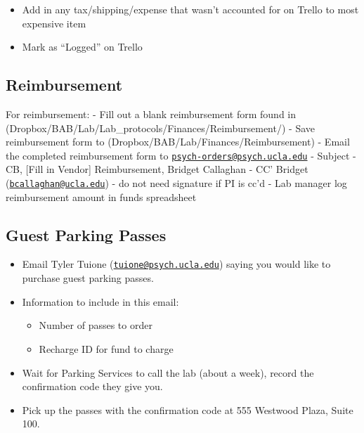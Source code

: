 \documentclass[]{book}
\providecommand{\tightlist}{%
  \setlength{\itemsep}{0pt}\setlength{\parskip}{0pt}}
\begin{document}
\begin{itemize}
  \begin{itemize}
  \tightlist
  \item
    Add in any tax/shipping/expense that wasn't accounted for on Trello to most expensive item
  \item
    Mark as ``Logged'' on Trello
  \end{itemize}
\end{itemize}

\hypertarget{reimbursement}{%
\subsection{Reimbursement}\label{reimbursement}}

For reimbursement:
- Fill out a blank reimbursement form found in (Dropbox/BAB/Lab/Lab\_protocols/Finances/Reimbursement/)
- Save reimbursement form to (Dropbox/BAB/Lab/Finances/Reimbursement)
- Email the completed reimbursement form to \href{mailto:psych-orders@psych.ucla.edu}{\nolinkurl{psych-orders@psych.ucla.edu}}
- Subject - CB, {[}Fill in Vendor{]} Reimbursement, Bridget Callaghan
- CC' Bridget (\href{mailto:bcallaghan@ucla.edu}{\nolinkurl{bcallaghan@ucla.edu}}) - do not need signature if PI is cc'd
- Lab manager log reimbursement amount in funds spreadsheet

\hypertarget{guest-parking-passes}{%
\subsection{Guest Parking Passes}\label{guest-parking-passes}}

\begin{itemize}
\tightlist
\item
  Email Tyler Tuione (\href{mailto:tuione@psych.ucla.edu}{\nolinkurl{tuione@psych.ucla.edu}}) saying you would like to purchase guest parking passes.
\item
  Information to include in this email:

  \begin{itemize}
  \tightlist
  \item
    Number of passes to order
  \item
    Recharge ID for fund to charge
  \end{itemize}
\item
  Wait for Parking Services to call the lab (about a week), record the confirmation code they give you.
\item
  Pick up the passes with the confirmation code at 555 Westwood Plaza, Suite 100.
\end{itemize}
\end{document}
